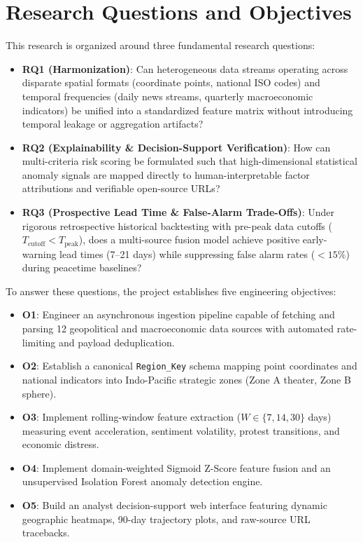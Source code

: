 \documentclass[preprint,12pt]{elsarticle}
\begin{document}
\section{Research Questions and Objectives}
\label{sec:rqs}

This research is organized around three fundamental research questions:
\begin{itemize}
    \item \textbf{RQ1 (Harmonization)}: Can heterogeneous data streams operating across disparate spatial formats (coordinate points, national ISO codes) and temporal frequencies (daily news streams, quarterly macroeconomic indicators) be unified into a standardized feature matrix without introducing temporal leakage or aggregation artifacts?
    \item \textbf{RQ2 (Explainability \& Decision-Support Verification)}: How can multi-criteria risk scoring be formulated such that high-dimensional statistical anomaly signals are mapped directly to human-interpretable factor attributions and verifiable open-source URLs?
    \item \textbf{RQ3 (Prospective Lead Time \& False-Alarm Trade-Offs)}: Under rigorous retrospective historical backtesting with pre-peak data cutoffs ($T_{\text{cutoff}} < T_{\text{peak}}$), does a multi-source fusion model achieve positive early-warning lead times (7--21 days) while suppressing false alarm rates ($<15\%$) during peacetime baselines?
\end{itemize}

To answer these questions, the project establishes five engineering objectives:
\begin{itemize}
    \item \textbf{O1}: Engineer an asynchronous ingestion pipeline capable of fetching and parsing 12 geopolitical and macroeconomic data sources with automated rate-limiting and payload deduplication.
    \item \textbf{O2}: Establish a canonical \texttt{Region\_Key} schema mapping point coordinates and national indicators into Indo-Pacific strategic zones (Zone A theater, Zone B sphere).
    \item \textbf{O3}: Implement rolling-window feature extraction ($W \in \{7, 14, 30\}$ days) measuring event acceleration, sentiment volatility, protest transitions, and economic distress.
    \item \textbf{O4}: Implement domain-weighted Sigmoid Z-Score feature fusion and an unsupervised Isolation Forest anomaly detection engine.
    \item \textbf{O5}: Build an analyst decision-support web interface featuring dynamic geographic heatmaps, 90-day trajectory plots, and raw-source URL tracebacks.
\end{itemize}
\end{document}
